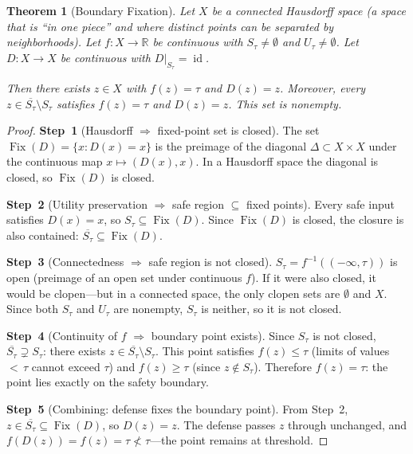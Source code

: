 \documentclass[11pt]{article}
\newtheorem{theorem}{Theorem}[section]
\newcommand{\R}{\mathbb{R}}
\newcommand{\cl}[1]{\overline{#1}}
\newcommand{\Fix}{\operatorname{Fix}}
\newcommand{\id}{\operatorname{id}}
\begin{document}
\begin{theorem}[Boundary Fixation]
\label{thm:main}
Let $X$ be a connected Hausdorff space (a space that is ``in one piece''
and where distinct points can be separated by neighborhoods). Let
$f\colon X\to\R$ be continuous with $S_\tau \neq \emptyset$ and
$U_\tau \neq \emptyset$. Let $D\colon X \to X$ be continuous with
$D|_{S_\tau} = \id$.

Then there exists $z\in X$ with $f(z) = \tau$ and $D(z) = z$.
Moreover, every $z \in \cl{S_\tau} \setminus S_\tau$ satisfies
$f(z) = \tau$ and $D(z) = z$. This set is nonempty.
\end{theorem}

\begin{proof}
\space

\textbf{Step~1} (Hausdorff $\Rightarrow$ fixed-point set is closed).
The set $\Fix(D) = \{x : D(x) = x\}$ is the preimage of the diagonal
$\Delta \subset X \times X$ under the continuous map
$x \mapsto (D(x), x)$. In a Hausdorff space the diagonal is closed,
so $\Fix(D)$ is closed.

\textbf{Step~2} (Utility preservation $\Rightarrow$ safe region
$\subseteq$ fixed points).
Every safe input satisfies $D(x) = x$, so $S_\tau \subseteq \Fix(D)$.
Since $\Fix(D)$ is closed, the closure is also contained:
$\cl{S_\tau} \subseteq \Fix(D)$.

\textbf{Step~3} (Connectedness $\Rightarrow$ safe region is not closed).
$S_\tau = f^{-1}((-\infty,\tau))$ is open (preimage of an open set
under continuous $f$). If it were also closed, it would be clopen---but
in a connected space, the only clopen sets are $\emptyset$ and $X$.
Since both $S_\tau$ and $U_\tau$ are nonempty, $S_\tau$ is neither,
so it is not closed.

\textbf{Step~4} (Continuity of $f$ $\Rightarrow$ boundary point exists).
Since $S_\tau$ is not closed, $\cl{S_\tau} \supsetneq S_\tau$: there
exists $z \in \cl{S_\tau} \setminus S_\tau$. This point satisfies
$f(z) \leq \tau$ (limits of values ${<}\,\tau$ cannot exceed $\tau$)
and $f(z) \geq \tau$ (since $z \notin S_\tau$). Therefore
$f(z) = \tau$: the point lies exactly on the safety boundary.

\textbf{Step~5} (Combining: defense fixes the boundary point).
From Step~2, $z \in \cl{S_\tau} \subseteq \Fix(D)$, so $D(z) = z$.
The defense passes $z$ through unchanged, and
$f(D(z)) = f(z) = \tau \not< \tau$---the point remains at threshold.
\end{proof}
\end{document}
